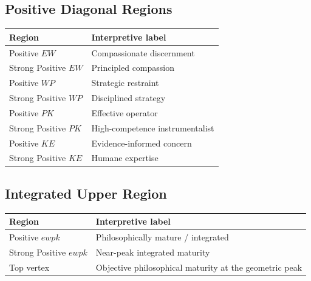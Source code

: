 \documentclass[11pt]{article}
\begin{document}
\subsection*{Positive Diagonal Regions}
\begin{center}
\begin{tabular}{>{\raggedright\arraybackslash}p{4.6cm} >{\raggedright\arraybackslash}p{8.6cm}}
\toprule
Region & Interpretive label \\
\midrule
Positive $EW$ & Compassionate discernment \\
Strong Positive $EW$ & Principled compassion \\
Positive $WP$ & Strategic restraint \\
Strong Positive $WP$ & Disciplined strategy \\
Positive $PK$ & Effective operator \\
Strong Positive $PK$ & High-competence instrumentalist \\
Positive $KE$ & Evidence-informed concern \\
Strong Positive $KE$ & Humane expertise \\
\bottomrule
\end{tabular}
\end{center}

\subsection*{Integrated Upper Region}
\begin{center}
\begin{tabular}{>{\raggedright\arraybackslash}p{4.6cm} >{\raggedright\arraybackslash}p{8.6cm}}
\toprule
Region & Interpretive label \\
\midrule
Positive $ewpk$ & Philosophically mature / integrated \\
Strong Positive $ewpk$ & Near-peak integrated maturity \\
Top vertex & Objective philosophical maturity at the geometric peak \\
\bottomrule
\end{tabular}
\end{center}
\end{document}
